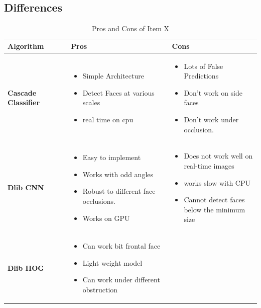 \subsection{Differences}
\begin{table}[h]
    \centering
    \caption{Pros and Cons of Item X}
    \begin{tabular}{|p{0.25\linewidth}|p{0.4\linewidth}|p{0.4\linewidth}|}
    \textbf{Algorithm}
    & \textbf{Pros} & \textbf{Cons} \\
    \hline
    \textbf{Cascade Classifier} & 
    \begin{itemize}
    \item Simple Architecture
    \item Detect Faces at various scales
    \item real time on cpu
    \end{itemize}
    &
    \begin{itemize}
    \item Lots of False Predictions
    \item Don't work on side faces
    \item Don’t work under occlusion.
    \end{itemize} \\
    \hline
    \textbf{Dlib CNN} & 
    \begin{itemize}
    \item Easy to
    implement
    \item Works with odd angles
    \item Robust to different face occlusions.
    \item Works on GPU
    \end{itemize}
    &
    \begin{itemize}
    \item Does not work
    well on real-time
    images
    \item works slow with CPU
    \item  Cannot detect faces below the minimum size
    \end{itemize} \\
    \hline
    \textbf{Dlib HOG} & 
    \begin{itemize}
    \item Can work bit
    frontal face
    \item Light weight
    model
    \item Can work under different obstruction
    \end{itemize}
    &
    \begin{itemize}

\end{itemize}
\end{tabular}
\end{table}
